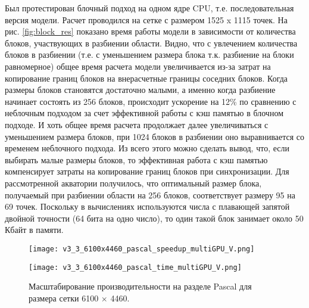 Был протестирован блочный подход на одном ядре CPU, т.е. последовательная версия модели.
Расчет проводился на сетке с размером 1525 x 1115 точек.
На рис. \ref{fig:block_res} показано время работы модели в зависимости от количества блоков, участвующих в разбиении области. Видно, что с увлечением количества блоков в разбиении (т.е. с уменьшением размера блока т.к. разбиение на блоки равномерное) общее время расчета модели увеличивается из-за затрат на копирование границ блоков на внерасчетные границы соседних блоков.
Когда размеры блоков становятся достаточно малыми, а именно когда разбиение начинает состоять из 256 блоков, происходит ускорение на 12\% по сравнению с неблочным подходом за счет эффективной работы с кэш памятью в блочном подходе.
И хоть общее время расчета продолжает далее увеличиваться с уменьшением размера блоков, при 1024 блоков в разбиении оно выравнивается со временем неблочного подхода.
Из всего этого можно сделать вывод, что, если выбирать малые размеры блоков, то эффективная работа с кэш памятью компенсирует затраты на копирование границ блоков при синхронизации.
Для рассмотренной акватории получилось, что оптимальный размер блока, получаемый
при разбиении области на 256 блоков, соответствует размеру 95 на 69 точек. Поскольку в вычислениях используются числа с плавающей запятой двойной точности (64 бита на одно число), то один такой блок занимает около 50 Кбайт в памяти.

\begin{figure}[!ht]
	\begin{minipage}{0.5\linewidth}
	\centering
	\texttt{[image: v3\_3\_6100x4460\_pascal\_speedup\_multiGPU\_V.png]}
	\end{minipage}
	\begin{minipage}{0.5\linewidth}
	\centering
    \texttt{[image: v3\_3\_6100x4460\_pascal\_time\_multiGPU\_V.png]}
	\end{minipage}
	\vspace{3pt}
	\caption{Масштабирование производительности на разделе Pascal для размера сетки 6100 $\times$ 4460.}
	\label{fig:TheBox}
\end{figure}


